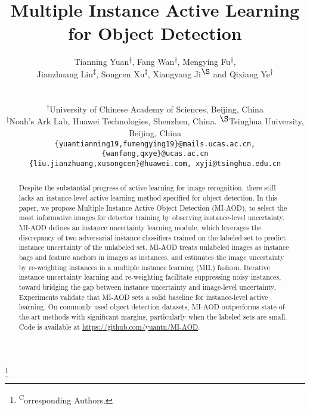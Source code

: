 \documentclass[final]{cvpr}
\newcommand\nmfootnote[1]{\begingroup
  \renewcommand\thefootnote{}\footnote{#1}\addtocounter{footnote}{-1}\endgroup
}
\begin{document}
\title{Multiple Instance Active Learning for Object Detection}

\author{
Tianning Yuan\textsuperscript{$\dag$}, Fang Wan\textsuperscript{$\dag$\footnotemark[1]}, Mengying Fu\textsuperscript{$\dag$},\\
Jianzhuang Liu\textsuperscript{$\ddag$}, Songcen Xu\textsuperscript{$\ddag$}, Xiangyang Ji\textsuperscript{$\S$} and Qixiang Ye\textsuperscript{$\dag$\footnotemark[1]}\\
\\
\\
\textsuperscript{$\dag$}University of Chinese Academy of Sciences, Beijing, China\\
\textsuperscript{$\ddag$}Noah’s Ark Lab, Huawei Technologies, Shenzhen, China. \textsuperscript{$\S$}Tsinghua University, Beijing, China\\
\tt\small \{yuantianning19,fumengying19\}@mails.ucas.ac.cn, \{wanfang,qxye\}@ucas.ac.cn\\
\tt\small \{liu.jianzhuang,xusongcen\}@huawei.com, xyji@tsinghua.edu.cn

}

\maketitle


\nmfootnote{\textsuperscript*Corresponding Authors.} 

\begin{abstract}

Despite the substantial progress of active learning for image recognition, there still lacks an instance-level active learning method specified for object detection. In this paper, we propose Multiple Instance Active Object Detection (MI-AOD), to select the most informative images for detector training by observing instance-level uncertainty. MI-AOD defines an instance uncertainty learning module, which leverages the discrepancy of two adversarial instance classifiers trained on the labeled set to predict instance uncertainty of the unlabeled set. MI-AOD treats unlabeled images as instance bags and feature anchors in images as instances, and estimates the image uncertainty by re-weighting instances in a multiple instance learning (MIL) fashion. Iterative instance uncertainty learning and re-weighting facilitate suppressing noisy instances, toward bridging the gap between instance uncertainty and image-level uncertainty. Experiments validate that MI-AOD sets a solid baseline for instance-level active learning. On commonly used object detection datasets, MI-AOD outperforms state-of-the-art methods with significant margins, particularly when the labeled sets are small. 
Code is available at \href{https://github.com/yuantn/MI-AOD}{https://github.com/yuantn/MI-AOD}.

\end{abstract}
\end{document}
